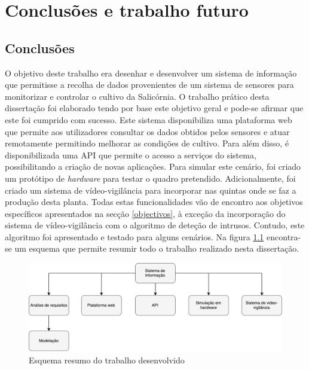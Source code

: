 \chapter{Conclusões e trabalho futuro}


\section{Conclusões}



O objetivo deste trabalho era desenhar e desenvolver um sistema de informação que permitisse a recolha de dados provenientes de um sistema de sensores para monitorizar e controlar o cultivo da Salicórnia. O trabalho prático desta dissertação foi elaborado tendo por base este objetivo geral e pode-se afirmar que este foi cumprido com sucesso. Este sistema disponibiliza uma plataforma web que permite aos utilizadores consultar os dados obtidos pelos sensores e atuar remotamente permitindo melhorar as condições de cultivo. Para além disso, é disponibilizada uma \ac{API} que permite o acesso a serviços do sistema, possibilitando a criação de novas aplicações. Para simular este cenário, foi criado um protótipo de \textit{hardware} para testar o quadro pretendido. Adicionalmente, foi criado um sistema de vídeo-vigilância para incorporar nas quintas onde se faz a produção desta planta. Todas estas funcionalidades vão de encontro aos objetivos específicos apresentados na secção \ref{objectivos}, à exceção da incorporação do sistema de vídeo-vigilância com o algoritmo de deteção de intrusos. Contudo, este algoritmo foi apresentado e testado para alguns cenários. Na figura \ref{resumo} encontra-se um esquema que permite resumir todo o trabalho realizado nesta dissertação. 

\begin{figure}[h]
	\centering
	\includegraphics[width=0.79\linewidth]{esquemas/conclusaofinal.pdf}
	\caption{Esquema resumo do trabalho desenvolvido}
	\label{resumo}
\end{figure}



